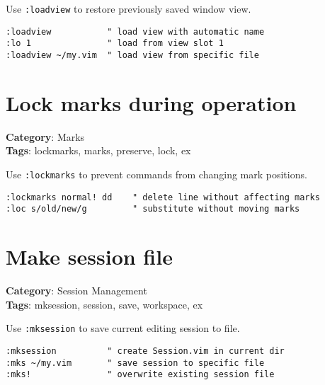 {{{{Use {\footnotesize \Verb§:loadview§} to restore previously saved window view.

\begin{Exa*}{}
\begin{Verbatim}[fontsize=\footnotesize, breaklines, breakanywhere]
:loadview           " load view with automatic name
:lo 1               " load from view slot 1
:loadview ~/my.vim  " load view from specific file
\end{Verbatim}
\end{Exa*}

\section{Lock marks during operation}

\textbf{Category}: Marks\\ \textbf{Tags}: lockmarks, marks, preserve, lock, ex
\vspace{0.5cm}

Use {\footnotesize \Verb§:lockmarks§} to prevent commands from changing mark positions.

\begin{Exa*}{}
\begin{Verbatim}[fontsize=\footnotesize, breaklines, breakanywhere]
:lockmarks normal! dd    " delete line without affecting marks
:loc s/old/new/g         " substitute without moving marks
\end{Verbatim}
\end{Exa*}

\section{Make session file}

\textbf{Category}: Session Management\\ \textbf{Tags}: mksession, session, save, workspace, ex
\vspace{0.5cm}

Use {\footnotesize \Verb§:mksession§} to save current editing session to file.

\begin{Exa*}{}
\begin{Verbatim}[fontsize=\footnotesize, breaklines, breakanywhere]
:mksession          " create Session.vim in current dir
:mks ~/my.vim       " save session to specific file
:mks!               " overwrite existing session file
\end{Verbatim}
\end{Exa*}

}}}}
